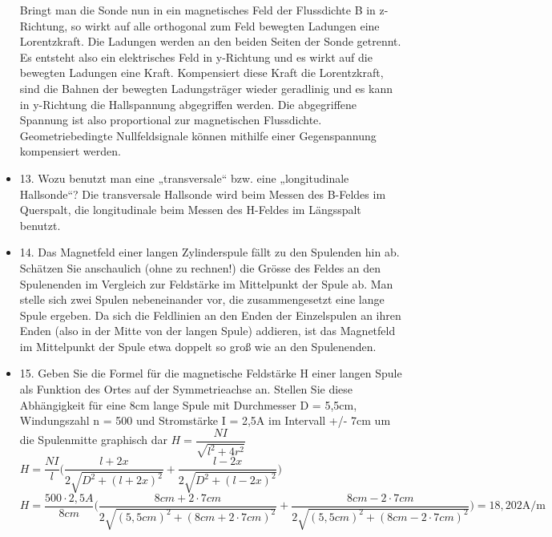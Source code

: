 \begin{itemize}
Bringt man die Sonde nun in ein magnetisches Feld der Flussdichte B in z-Richtung, so wirkt auf alle orthogonal zum Feld bewegten Ladungen eine Lorentzkraft. Die Ladungen werden an den beiden Seiten der Sonde getrennt. Es entsteht also ein elektrisches Feld in y-Richtung und es wirkt auf die bewegten Ladungen eine Kraft. Kompensiert diese Kraft die Lorentzkraft, sind die Bahnen der bewegten Ladungsträger wieder geradlinig und es kann in y-Richtung die Hallspannung abgegriffen werden.
Die abgegriffene Spannung ist also proportional zur magnetischen Flussdichte. 
Geometriebedingte Nullfeldsignale können mithilfe einer Gegenspannung kompensiert werden.
\item 13. Wozu benutzt man eine „transversale“ bzw. eine „longitudinale Hallsonde“?
\newline
Die transversale Hallsonde wird beim Messen des B-Feldes im Querspalt, die longitudinale beim Messen des H-Feldes im Längsspalt benutzt.
\item 14. Das Magnetfeld einer langen Zylinderspule fällt zu den Spulenden hin ab. Schätzen Sie anschaulich
(ohne zu rechnen!) die Grösse des Feldes an den Spulenenden im Vergleich zur Feldstärke im Mittelpunkt der Spule ab.
\newline
Man stelle sich zwei Spulen nebeneinander vor, die zusammengesetzt eine lange Spule ergeben. Da sich die Feldlinien an den Enden der Einzelspulen an ihren Enden (also in der Mitte von der langen Spule) addieren, ist das Magnetfeld  im Mittelpunkt der Spule etwa doppelt so groß wie an den Spulenenden.
\item 15. Geben Sie die Formel für die magnetische Feldstärke H einer langen Spule als Funktion des Ortes auf der Symmetrieachse an. Stellen Sie diese Abhängigkeit für eine 8cm lange Spule mit Durchmesser D = 5,5cm, Windungszahl n = 500 und Stromstärke I = 2,5A im Intervall +/- 7cm um die Spulenmitte graphisch dar
\newline
$H=\dfrac{NI}{\sqrt{l^2+4r^2}}$\\
$H=\dfrac{NI}{l}\Bigg(\dfrac{l+2x}{2\sqrt{D^2+(l+2x)^2}}+\dfrac{l-2x}{2\sqrt{D^2+(l-2x)^2}}\Bigg)$\\
$H=\dfrac{500\cdot2,5A}{8cm}\Bigg(\dfrac{8cm+2\cdot7cm}{2\sqrt{(5,5cm)^2+(8cm+2\cdot 7cm)^2}}+\dfrac{8cm-2\cdot7cm}{2\sqrt{(5,5cm)^2+(8cm-2\cdot 7cm)^2}}\Bigg)=18,202 \text{A/m}$
\\\\\\\\\\\\\\\\\\\\\\\\\\\\\\


\end{itemize}
